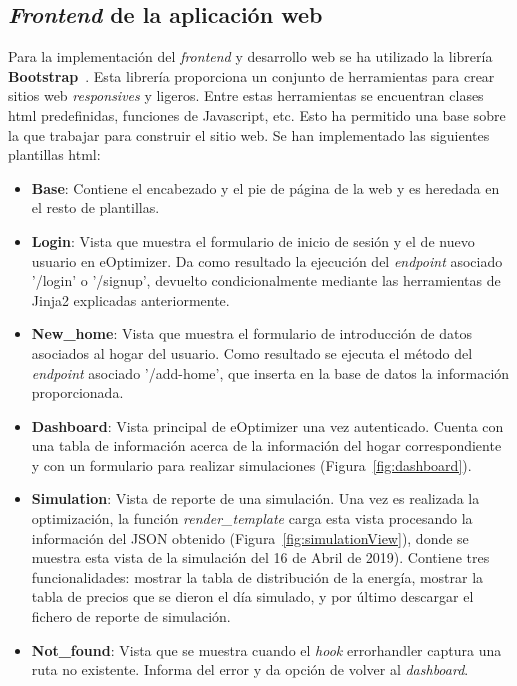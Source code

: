 \subsection{\textit{Frontend} de la aplicación web}
Para la implementación del \textit{frontend} y desarrollo web se ha utilizado la librería \textbf{Bootstrap}~\cite{Boots}. Esta librería proporciona un conjunto de herramientas para crear sitios web \textit{responsives} y ligeros. Entre estas herramientas se encuentran clases html predefinidas, funciones de Javascript, etc. Esto ha permitido una base sobre la que trabajar para construir el sitio web. Se han implementado las siguientes plantillas html:
\begin{itemize}
\item \textbf{Base}: Contiene el encabezado y el pie de página de la web y es heredada en el resto de plantillas.
\item \textbf{Login}: Vista que muestra el formulario de inicio de sesión y el de nuevo usuario en eOptimizer. Da como resultado la ejecución del \textit{endpoint} asociado '/login' o '/signup', devuelto condicionalmente mediante las herramientas de Jinja2 explicadas anteriormente.
\item \textbf{New\_home}: Vista que muestra el formulario de introducción de datos asociados al hogar del usuario. Como resultado se ejecuta el método del \textit{endpoint} asociado '/add-home', que inserta en la base de datos la información proporcionada.
\item \textbf{Dashboard}: Vista principal de eOptimizer una vez autenticado. Cuenta con una tabla de información acerca de la información del hogar correspondiente y con un formulario para realizar simulaciones (Figura~\ref{fig:dashboard}).
\item \textbf{Simulation}: Vista de reporte de una simulación. Una vez es realizada la optimización, la función \textit{render\_template} carga esta vista procesando la información del \gls{JSON} obtenido (Figura~\ref{fig:simulationView}), donde se muestra esta vista de la simulación del 16 de Abril de 2019). Contiene tres funcionalidades: mostrar la tabla de distribución de la energía, mostrar la tabla de precios que se dieron el día simulado, y por último descargar el fichero de reporte de simulación.
\item \textbf{Not\_found}: Vista que se muestra cuando el \textit{hook} errorhandler captura una ruta no existente. Informa del error y da opción de volver al \textit{dashboard}.
\end{itemize}
